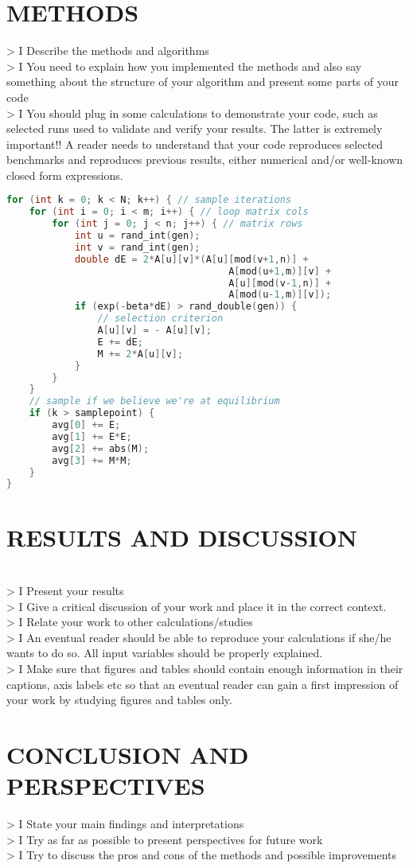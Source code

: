 \documentclass[11pt,english,a4paper]{article}
\begin{document}
\section*{\uppercase{Methods}}
> I Describe the methods and algorithms\\
> I You need to explain how you implemented the methods and also say something about the structure of your algorithm and present some parts of your code\\
> I You should plug in some calculations to demonstrate your code, such as selected runs used to validate and verify your results. The latter is extremely important!! A reader needs to understand that your code reproduces selected benchmarks and reproduces previous results, either numerical and/or well-known closed form expressions.
\begin{lstlisting}[language=c++]
for (int k = 0; k < N; k++) { // sample iterations
    for (int i = 0; i < m; i++) { // loop matrix cols  
        for (int j = 0; j < n; j++) { // matrix rows
            int u = rand_int(gen);
            int v = rand_int(gen);
            double dE = 2*A[u][v]*(A[u][mod(v+1,n)] + 
                                       A[mod(u+1,m)][v] +
                                       A[u][mod(v-1,n)] + 
                                       A[mod(u-1,m)][v]);
            if (exp(-beta*dE) > rand_double(gen)) {
                // selection criterion                
                A[u][v] = - A[u][v];
                E += dE; 
                M += 2*A[u][v];
            }
        }
    }
    // sample if we believe we're at equilibrium
    if (k > samplepoint) {
        avg[0] += E;
        avg[1] += E*E;
        avg[2] += abs(M);
        avg[3] += M*M;
    }
}
\end{lstlisting}
\section*{\uppercase{Results and discussion}}
\\

> I Present your results\\
> I Give a critical discussion of your work and place it in the correct context.\\
> I Relate your work to other calculations/studies\\
> I An eventual reader should be able to reproduce your calculations if she/he wants to do so. All input variables should be properly explained.\\
> I Make sure that figures and tables should contain enough information in their captions, axis labels etc so that an eventual reader can gain a first impression of your work by studying figures and tables only.
\section*{\uppercase{Conclusion and perspectives}}
> I State your main findings and interpretations\\
> I Try as far as possible to present perspectives for future work\\
> I Try to discuss the pros and cons of the methods and possible improvements

\printbibliography
\end{document}
